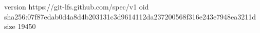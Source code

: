 version https://git-lfs.github.com/spec/v1
oid sha256:07f87edab0d4a8d4b203131c3d9614112da237200568f316e243e7948ea3211d
size 19450
